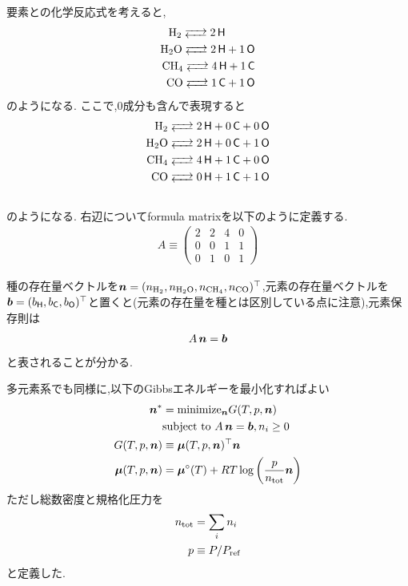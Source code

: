 要素との化学反応式を考えると,
\begin{align*}
\ce{H2 <--> 2 $\Hel$ \, \, \, \, \, \, \, \, \\
H2O <--> 2 $\Hel$ + 1 $\Oel$ \\
CH4 <--> 4 $\Hel$ + 1 $\Cel$ \\
CO <-->  1 $\Cel$ + 1 $\Oel$
}
\end{align*}
のようになる. ここで,0成分も含んで表現すると
\begin{align*}
\ce{H2 <--> 2 $\Hel$ + 0 $\Cel$ + 0 $\Oel$ \\
H2O <--> 2 $\Hel$ + 0 $\Cel$ + 1 $\Oel$ \\
CH4 <--> 4 $\Hel$ + 1 $\Cel$ + 0 $\Oel$ \\
CO <--> 0 $\Hel$ + 1 $\Cel$ + 1 $\Oel$ \\ 
}
\end{align*}
のようになる. 右辺についてformula matrixを以下のように定義する. 
\begin{align*}
  A \equiv
\begin{pmatrix} 
2 & 2 & 4 & 0 \\
0 & 0 & 1 & 1 \\
0 & 1 & 0 & 1 
\end{pmatrix}  
\end{align*}

種の存在量ベクトルを$\boldsymbol{n} = (n_\mathrm{H_2}, n_\mathrm{H_2 O},n_\mathrm{C H_4},n_\mathrm{CO})^\top$,元素の存在量ベクトルを$\boldsymbol{b} = (b_{\mathsf{H}}, b_{\mathsf{C}}, b_{\mathsf{O}})^\top$と置くと(元素の存在量を種とは区別している点に注意),元素保存則は
\begin{align}
    A \, \boldsymbol{n} = \boldsymbol{b} 
\end{align}
と表されることが分かる. 


多元素系でも同様に,以下のGibbsエネルギーを最小化すればよい
\begin{align}
\label{eq:gibss_multi}
    \boldsymbol{n}^\ast &= \mathrm{minimize}_{\boldsymbol{n}} G(T, p, \boldsymbol{n}) \nonumber \\
    &\mbox{subject to} \,\, A \, \boldsymbol{n} = \boldsymbol{b}, n_i \ge 0\\
    G(T, p, \boldsymbol{n}) &\equiv  \boldsymbol{\mu} (T, p, \boldsymbol{n})^\top \boldsymbol{n}\\ 
    \label{eq:chemical_potential_mu}
    \boldsymbol{\mu} (T, p, \boldsymbol{n}) &=  \boldsymbol{\mu}^\circ(T) + RT \log{\left(\frac{p}{n_\mathrm{tot}} \boldsymbol{n}\right)} 
\end{align}
ただし総数密度と規格化圧力を
\begin{align}
\label{eq:ntot_tce}
    n_\mathrm{tot} &= \sum_i n_i \\
    p &\equiv P/P_\mathrm{ref}
\end{align}
と定義した. 

